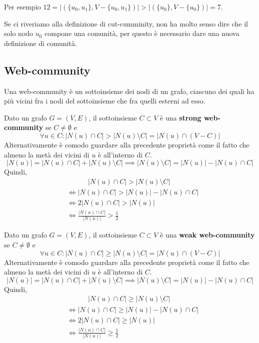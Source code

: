 Per esempio $12 = |(\{ u_0, u_1 \}, V - \{ u_0, u_1 \} )| >  |(\{ u_0 \}, V - \{ u_0 \} )| = 7$.

Se ci riveriamo alla definizione di cut-cumminity, non ha molto senso dire che il solo nodo $u_0$ compone una comunità, per questo è necessario dare una nuova definizione di comunità.

\subsection{Web-community}

Una web-community è un sottoinsieme dei nodi di un grafo, ciascuno dei quali ha più vicini fra i nodi del sottoinsieme che fra quelli esterni ad esso.

\begin{definizione}
    Dato un grafo $G = (V, E)$, il sottoinsieme $C \subset V$ è una \textbf{strong web-community} se $C \neq \emptyset$ e
    \[
    \forall u \in C: |N(u) \cap C| > |N(u) \setminus C| = |N(u) \cap (V - C)|
    \]
    Alternativamente è comodo guardare alla precedente proprietà come il fatto che almeno la metà dei vicini di $u$ è all'interno di $C$.
    \[|N(u)| =  |N(u) \cap C| + |N(u) \setminus C| \implies  |N(u) \setminus C| = |N(u)| - |N(u) \cap C|\]
    Quindi, 
    \begin{align*}
        &\quad\quad\quad |N(u) \cap C| > |N(u) \setminus C| \\ 
        &\iff |N(u) \cap C| > |N(u)| - |N(u) \cap C| \\
        &\iff 2|N(u) \cap C| > |N(u)|\\ 
        &\iff \frac{|N(u) \cap C|}{|N(u)|} > \frac{1}{2}
    \end{align*}
\end{definizione}

\begin{definizione}
    Dato un grafo $G = (V, E)$, il sottoinsieme $C \subset V$ è una \textbf{weak web-community} se $C \neq \emptyset$ e
    \[
    \forall u \in C: |N(u) \cap C| \geq |N(u) \setminus C| = |N(u) \cap (V - C)|
    \]
    Alternativamente è comodo guardare alla precedente proprietà come il fatto che almeno la metà dei vicini di $u$ è all'interno di $C$.
    \[|N(u)| =  |N(u) \cap C| + |N(u) \setminus C| \implies  |N(u) \setminus C| = |N(u)| - |N(u) \cap C|\]
    Quindi, 
    \begin{align*}
        &\quad\quad\quad |N(u) \cap C| \geq |N(u) \setminus C| \\ 
        &\iff |N(u) \cap C| \geq |N(u)| - |N(u) \cap C| \\
        &\iff 2|N(u) \cap C| \geq |N(u)|\\ 
        &\iff \frac{|N(u) \cap C|}{|N(u)|} \geq \frac{1}{2}
    \end{align*}
\end{definizione}

